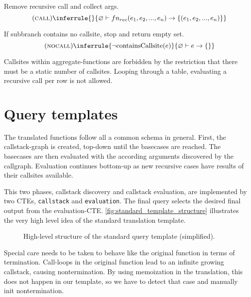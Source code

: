 Remove recursive call and collect args.
$$\quad(\textsc{call})\inferrule{
}{
    \varnothing \vdash fn_{rec}(e_1, e_2, ..., e_n) \rightarrow \{ (e_1, e_2, ..., e_n) \}
}$$

If subbranch contains no callsite, stop and return empty set.
$$\quad(\textsc{nocall})\inferrule{
\neg \text{containsCallsite}(e)
}{  
    \varnothing \vdash e \rightarrow \{\}
}$$

Callsites within aggregate-functions are forbidden by the restriction that there must be a static number of callsites. Looping through a table, evaluating a recursive call per row is not allowed.



\chapter{Query templates}\label{template}
The translated functions follow all a common schema in general. First, the callstack-graph is created, top-down until the basecases are reached. The basecases are then evaluated with the according arguments discovered by the callgraph. Evaluation continues bottom-up as new recursive cases have results of their callsites available.

This two phases, callstack discovery and callstack evaluation, are implemented by two CTEs, \texttt{callstack} and \texttt{evaluation}. The final query selects the desired final output from the evaluation-CTE. \autoref{fig:standard_template_structure} illustrates the very high level idea of the standard translation template.

\begin{figure}[h!]
    \centering
    \caption{High-level structure of the standard query template (simplified).}
    \label{fig:standard_template_structure}
\end{figure}

Special care needs to be taken to behave like the original function in terms of termination. Call-loops in the original function lead to an infinite growing callstack, causing nontermination. By using memoization in the translation, this does not happen in our template, so we have to detect that case and manually init nontermination.

